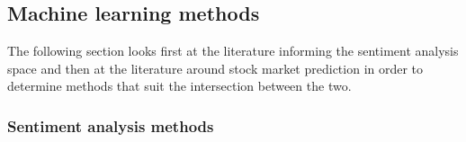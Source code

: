 \documentclass[11pt,preprint, authoryear]{elsarticle}
\numberwithin{equation}{section}
\numberwithin{figure}{section}
\numberwithin{table}{section}
\begin{document}
\hypertarget{machine-learning-methods}{%
\subsection{Machine learning methods}\label{machine-learning-methods}}

The following section looks first at the literature informing the
sentiment analysis space and then at the literature around stock market
prediction in order to determine methods that suit the intersection
between the two.

\hypertarget{sentiment-analysis-methods}{%
\subsubsection{Sentiment analysis
methods}\label{sentiment-analysis-methods}}
\end{document}
